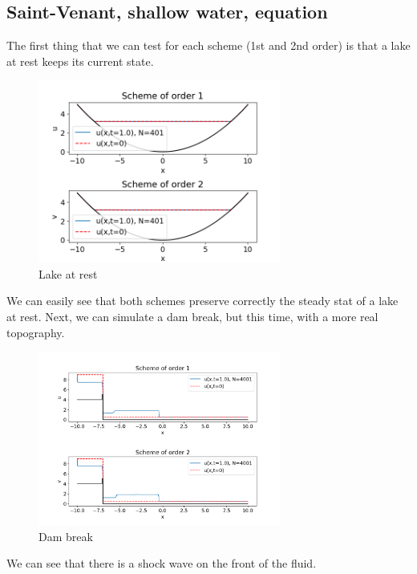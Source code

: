         \subsection{Saint-Venant, shallow water, equation}
            The first thing that we can test for each scheme (1st and 2nd order) is that a lake at rest keeps its current state.
            
            \begin{figure}[H]
                \centering
                \includegraphics[width= 8cm]{LFSV/L2cst.png}
                \caption{Lake at rest}
                \label{fig:Lcst}
            \end{figure}
            
            We can easily see that both schemes preserve correctly the steady stat of a lake at rest.
            Next, we can simulate a dam break, but this time, with a more real topography.
            \begin{figure}[H]
                \centering
                \includegraphics[width= 8cm]{LFSV/dambreakHR.png}
                \caption{Dam break}
                \label{fig:my_db}
            \end{figure}
            We can see that there is a shock wave on the front of the fluid.
            
           
            
